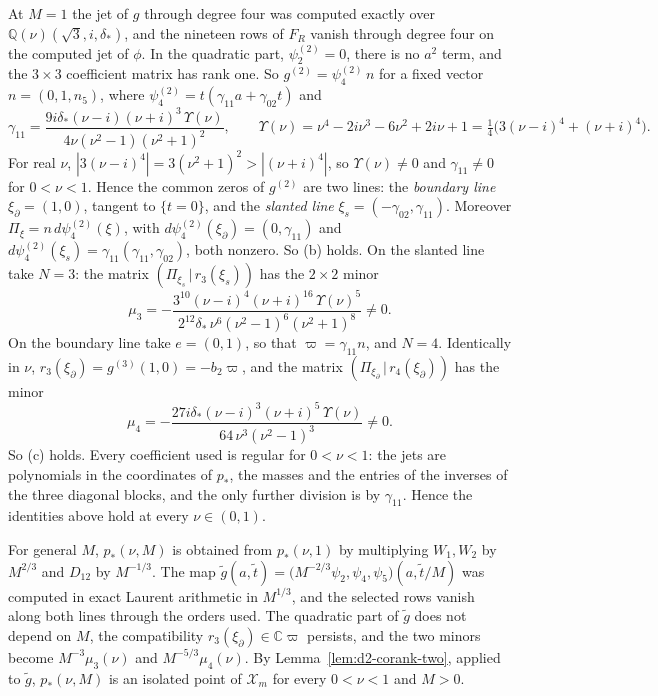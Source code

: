 \documentclass[11pt]{amsart}
\theoremstyle{definition}
\theoremstyle{remark}
\newcommand{\C}{\mathbb{C}}
\begin{document}
At $M=1$ the jet of $g$ through degree four was computed exactly over
$\mathbb Q(\nu)(\sqrt3,i,\delta_*)$, and the nineteen rows of $F_R$ vanish through degree four on
the computed jet of $\phi$.  In the quadratic part, $\psi_2^{(2)}=0$, there is no $a^2$ term,
and the $3\times3$ coefficient matrix has rank one.  So $g^{(2)}=\psi_4^{(2)}\,n$ for a fixed
vector $n=(0,1,n_5)$, where $\psi_4^{(2)}=t(\gamma_{11}a+\gamma_{02}t)$ and
\[
  \gamma_{11}=\frac{9i\delta_*(\nu-i)(\nu+i)^3\,\Upsilon(\nu)}{4\nu(\nu^2-1)(\nu^2+1)^2},\qquad
  \Upsilon(\nu)=\nu^4-2i\nu^3-6\nu^2+2i\nu+1=\tfrac14\bigl(3(\nu-i)^4+(\nu+i)^4\bigr).
\]
For real $\nu$, $|3(\nu-i)^4|=3(\nu^2+1)^2>|(\nu+i)^4|$, so $\Upsilon(\nu)\ne0$ and
$\gamma_{11}\ne0$ for $0<\nu<1$.  Hence the common zeros of $g^{(2)}$ are two lines: the
\emph{boundary line} $\xi_\partial=(1,0)$, tangent to $\{t=0\}$, and the \emph{slanted line}
$\xi_s=(-\gamma_{02},\gamma_{11})$.  Moreover $\Pi_\xi=n\,d\psi_4^{(2)}(\xi)$, with
$d\psi_4^{(2)}(\xi_\partial)=(0,\gamma_{11})$ and
$d\psi_4^{(2)}(\xi_s)=\gamma_{11}(\gamma_{11},\gamma_{02})$, both nonzero.  So (b) holds.
On the slanted line take $N=3$: the matrix $(\Pi_{\xi_s}\,|\,r_3(\xi_s))$ has the $2\times2$
minor
\[
  \mu_3=-\frac{3^{10}(\nu-i)^4(\nu+i)^{16}\,\Upsilon(\nu)^5}
             {2^{12}\delta_*\,\nu^6(\nu^2-1)^6(\nu^2+1)^8}\ne0 .
\]
On the boundary line take $e=(0,1)$, so that $\varpi=\gamma_{11}n$, and $N=4$.  Identically in
$\nu$, $r_3(\xi_\partial)=g^{(3)}(1,0)=-b_2\varpi$, and the matrix
$(\Pi_{\xi_\partial}\,|\,r_4(\xi_\partial))$ has the minor
\[
  \mu_4=-\frac{27i\delta_*(\nu-i)^3(\nu+i)^5\,\Upsilon(\nu)}{64\,\nu^3(\nu^2-1)^3}\ne0 .
\]
So (c) holds.  Every coefficient used is regular for $0<\nu<1$: the jets are polynomials in the
coordinates of $p_*$, the masses and the entries of the inverses of the three diagonal blocks,
and the only further division is by $\gamma_{11}$.  Hence the identities above hold at every
$\nu\in(0,1)$.

For general $M$, $p_*(\nu,M)$ is obtained from $p_*(\nu,1)$ by multiplying $W_1,W_2$ by $M^{2/3}$
and $D_{12}$ by $M^{-1/3}$.  The map
$\tilde g(a,\tilde t)=\bigl(M^{-2/3}\psi_2,\psi_4,\psi_5\bigr)(a,\tilde t/M)$ was computed in
exact Laurent arithmetic in $M^{1/3}$, and the selected rows vanish along both lines through the
orders used.  The quadratic part of $\tilde g$ does not depend on $M$, the compatibility
$r_3(\xi_\partial)\in\C\varpi$ persists, and the two minors become $M^{-3}\mu_3(\nu)$ and
$M^{-5/3}\mu_4(\nu)$.  By Lemma~\ref{lem:d2-corank-two}, applied to $\tilde g$, $p_*(\nu,M)$ is
an isolated point of $\mathcal X_m$ for every $0<\nu<1$ and $M>0$.
\end{document}
